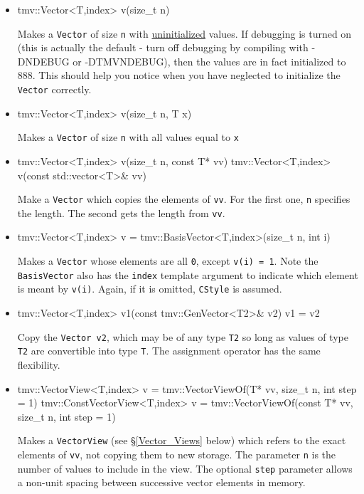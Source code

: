 \documentclass[twoside,letterpaper,11pt]{article}
\renewcommand{\tt}[1]{{\lstinline {#1}}}
\begin{document}
\begin{itemize}
\item 
\begin{tmvcode}
tmv::Vector<T,index> v(size_t n)
\end{tmvcode}
Makes a \tt{Vector} of size \tt{n} with \underline{uninitialized} values.
If debugging is turned on (this is actually the default - 
turn off debugging by compiling
with -DNDEBUG or -DTMVNDEBUG), then the values are in fact initialized to 888.  
This should help you notice
when you have neglected to initialize the \tt{Vector} correctly.

\item
\begin{tmvcode}
tmv::Vector<T,index> v(size_t n, T x)
\end{tmvcode}
Makes a \tt{Vector} of size \tt{n} with all values equal to \tt{x}

\item
\begin{tmvcode}
tmv::Vector<T,index> v(size_t n, const T* vv)
tmv::Vector<T,index> v(const std::vector<T>& vv)
\end{tmvcode}
Make a \tt{Vector} which copies the elements of \tt{vv}.
For the first one, \tt{n} specifies the length.  The second gets
the length from \tt{vv}.

\item
\begin{tmvcode}
tmv::Vector<T,index> v = tmv::BasisVector<T,index>(size_t n, int i)
\end{tmvcode}
Makes a \tt{Vector} whose elements are all \tt{0}, except \tt{v(i) = 1}.
Note the \tt{BasisVector} also has the \tt{index} template argument to 
indicate which element is meant by \tt{v(i)}.  Again, if it is omitted,
\tt{CStyle} is assumed.

\item
\begin{tmvcode}
tmv::Vector<T,index> v1(const tmv::GenVector<T2>& v2)
v1 = v2
\end{tmvcode}
Copy the \tt{Vector v2}, which may be of any type \tt{T2} so long
as values of type \tt{T2} are convertible into type \tt{T}.
The assignment operator has the same flexibility.

\item
\begin{tmvcode}
tmv::VectorView<T,index> v = 
      tmv::VectorViewOf(T* vv, size_t n, int step = 1)
tmv::ConstVectorView<T,index> v = 
      tmv::VectorViewOf(const T* vv, size_t n, int step = 1)
\end{tmvcode}
Makes a \tt{VectorView} (see \S\ref{Vector_Views} below) which refers to the exact
elements of \tt{vv}, not copying them to new storage.  The parameter \tt{n}
is the number of values to include in the view.
The optional \tt{step} parameter allows a non-unit spacing between 
successive vector elements in memory. 

\end{itemize}
\end{document}
